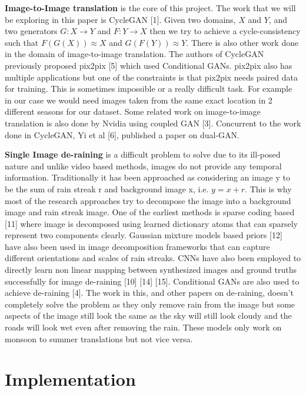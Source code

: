 \documentclass{article}
\begin{document}
\textbf{Image-to-Image translation} is the core of this project. The work that we will be exploring in this paper is CycleGAN [1]. Given two domains, $X$ and $Y$, and two generators $G: X \rightarrow Y$ and $F: Y \rightarrow  X$ then we try to achieve a cycle-consistency such that $F(G(X)) \approx X$ and $G(F(Y)) \approx Y$. There is also other work done in the domain of image-to-image translation. The authors of CycleGAN previously proposed pix2pix [5] which used Conditional GANs. pix2pix also has multiple applications but one of the constraints is that pix2pix needs paired data for training. This is sometimes impossible or a really difficult task. For example in our case we would need images taken from the same exact location in 2 different seasons for our dataset. Some related work on image-to-image translation is also done by Nvidia using coupled GAN [3]. Concurrent to the work done in CycleGAN, Yi et al [6], published a paper on dual-GAN.

\textbf{Single Image de-raining} is a difficult problem to solve due to its ill-posed nature and unlike video based methods, images do not provide any temporal information. Traditionally it has been approached as considering an image y to be the sum of rain streak r and background image x, i.e. $y = x + r$. This is why most of the research approaches try to decompose the image into a background image and rain streak image. One of the earliest methods is sparse coding based [11] where image is decomposed using learned dictionary atoms that can sparsely represent two components clearly. Gaussian mixture models based priors [12] have also been used in image decomposition frameworks that can capture different orientations and scales of rain streaks. CNNs have also been employed to directly learn non linear mapping between synthesized images and ground truths successfully for image de-raining [10] [14] [15]. Conditional GANs are also used to achieve de-raining [4]. The work in this, and other papers on de-raining, doesn’t completely solve the problem as they only remove rain from the image but some aspects of the image still look the same as the sky will still look cloudy and the roads will look wet even after removing the rain. These models only work on monsoon to summer translations but not vice versa.

\section{Implementation}
\label{implementation}
\end{document}
